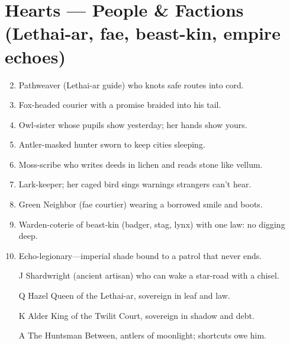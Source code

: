 \section*{Hearts --- People \& Factions (Lethai-ar, fae, beast-kin, empire echoes)}
\label{sec:valewood-people}
\begin{enumerate}
\setcounter{enumi}{1}
\item Pathweaver (Lethai-ar guide) who knots safe routes into cord.
\item Fox-headed courier with a promise braided into his tail.
\item Owl-sister whose pupils show yesterday; her hands show yours.
\item Antler-masked hunter sworn to keep cities sleeping.
\item Moss-scribe who writes deeds in lichen and reads stone like vellum.
\item Lark-keeper; her caged bird sings warnings strangers can't hear.
\item Green Neighbor (fae courtier) wearing a borrowed smile and boots.
\item Warden-coterie of beast-kin (badger, stag, lynx) with one law: no digging deep.
\item Echo-legionary---imperial shade bound to a patrol that never ends.
\item[J] Shardwright (ancient artisan) who can wake a star-road with a chisel.
\item[Q] Hazel Queen of the Lethai-ar, sovereign in leaf and law.
\item[K] Alder King of the Twilit Court, sovereign in shadow and debt.
\item[A] The Huntsman Between, antlers of moonlight; shortcuts owe him.
\end{enumerate}

